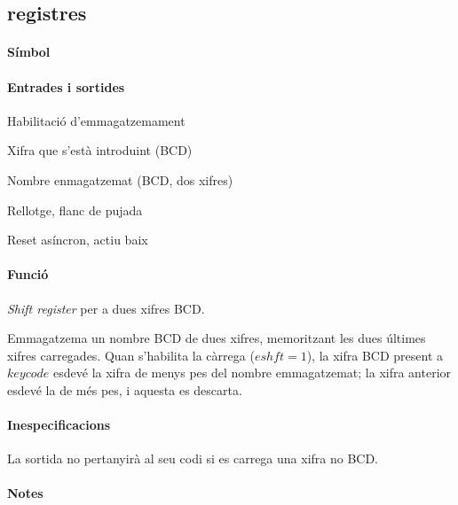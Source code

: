\subsection{\label{sub:\projectname-registres} \textsf{registres}}

\paragraph{Símbol}

\begin{center}  \end{center}

\paragraph{Entrades i sortides}

\begin{where}
\item[\nodenamebit{eshft}] Habilitació d'emmagatzemament
\item[\nodenamerange{keycode}{3}{0}] Xifra que s'està introduint (BCD)
\item[\nodenamerange{num}{7}{0}] Nombre enmagatzemat (BCD, dos xifres)
\item[\nodenamebit{clk}] Rellotge, flanc de pujada
\item[\nodenamebit{nrst}] Reset asíncron, actiu baix
\end{where}

\paragraph{Funció}

\emph{Shift register} per a dues xifres BCD.

Emmagatzema un nombre BCD de dues xifres, memoritzant les dues últimes
xifres carregades. Quan s'habilita la càrrega ($eshft = 1$), la xifra
BCD present a $keycode$ esdevé la xifra de menys pes del nombre
emmagatzemat; la xifra anterior esdevé la de més pes, i aquesta es descarta.

\paragraph{Inespecificacions}


La sortida no pertanyirà al seu codi si es carrega una xifra no BCD.


\paragraph{Notes}

